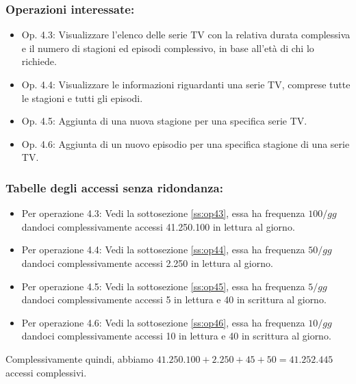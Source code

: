 \documentclass[a4paper,12pt]{report}
\begin{document}
\subsubsection{Operazioni interessate:}
\begin{itemize}
	\item Op. 4.3: Visualizzare l’elenco delle serie TV con la relativa durata complessiva e il numero di stagioni ed episodi complessivo, in base all’età di chi lo richiede.
	\item Op. 4.4: Visualizzare le informazioni riguardanti una serie TV, comprese tutte le stagioni e tutti gli episodi.
	\item Op. 4.5: Aggiunta di una nuova stagione per una specifica serie TV.
	\item Op. 4.6: Aggiunta di un nuovo episodio per una specifica stagione di una serie TV.
\end{itemize}
\subsubsection{Tabelle degli accessi senza ridondanza:}
\begin{itemize}
	\item Per operazione 4.3: Vedi la sottosezione \ref{ss:op43}, essa ha frequenza $100/gg$ dandoci complessivamente accessi 41.250.100 in lettura al giorno.
	\item Per operazione 4.4: Vedi la sottosezione \ref{ss:op44}, essa ha frequenza $50/gg$ dandoci complessivamente accessi 2.250 in lettura al giorno.
	\item Per operazione 4.5: Vedi la sottosezione \ref{ss:op45}, essa ha frequenza $5/gg$ dandoci complessivamente accessi 5 in lettura e 40 in scrittura al giorno.
	\item Per operazione 4.6: Vedi la sottosezione \ref{ss:op46}, essa ha frequenza $10/gg$ dandoci complessivamente accessi 10 in lettura e 40 in scrittura al giorno.
\end{itemize}
Complessivamente quindi, abbiamo $41.250.100 + 2.250 + 45 + 50 = 41.252.445$ accessi complessivi.
\end{document}

